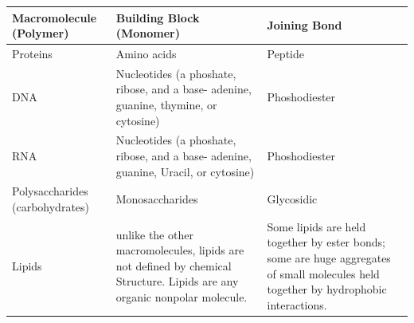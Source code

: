\documentclass[
]{book}
\begin{document}
\begin{table}[!h]
\centering
\begin{tabular}{>{\raggedright\arraybackslash}p{10em}>{\raggedright\arraybackslash}p{10em}>{\raggedright\arraybackslash}p{10em}}
\toprule
Macromolecule (Polymer) & Building Block (Monomer) & Joining Bond\\
\midrule
\rowcolor{gray!6}  Proteins & Amino acids & Peptide\\
DNA & Nucleotides (a phoshate, ribose, and a base- adenine, guanine, thymine, or cytosine) & Phoshodiester\\
\rowcolor{gray!6}  RNA & Nucleotides (a phoshate, ribose, and a base- adenine, guanine, Uracil, or cytosine) & Phoshodiester\\
Polysaccharides (carbohydrates) & Monosaccharides & Glycosidic\\
\rowcolor{gray!6}  Lipids & unlike the other macromolecules, lipids are not defined by chemical Structure. Lipids are any organic nonpolar molecule. & Some lipids are held together by ester bonds; some are huge aggregates of small molecules held together by hydrophobic interactions.\\
\bottomrule
\end{tabular}
\end{table}
\end{document}
